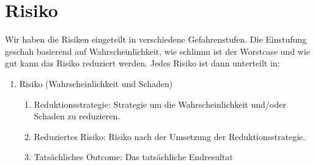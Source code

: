 \chapter{Risiko}
Wir haben die Risiken eingeteilt in verschiedene Gefahrenstufen.
Die Einstufung geschah basierend auf Wahrscheinlichkeit, wie schlimm ist der Worstcase und wie gut kann das Risiko reduziert werden.
Jedes Risiko ist dann unterteilt in:
\begin{enumerate}
    \item Risiko (Wahrscheinlichkeit und Schaden)
    \begin{enumerate}
        \item Reduktionsstrategie: Strategie um die Wahrscheinlichkeit und/oder Schaden zu reduzieren.
        \item Reduziertes Risiko: Risiko nach der Umsetzung der Reduktionsstrategie.
        \item Tatsächliches Outcome: Das tatsächliche Endresultat
    \end{enumerate}
\end{enumerate}

